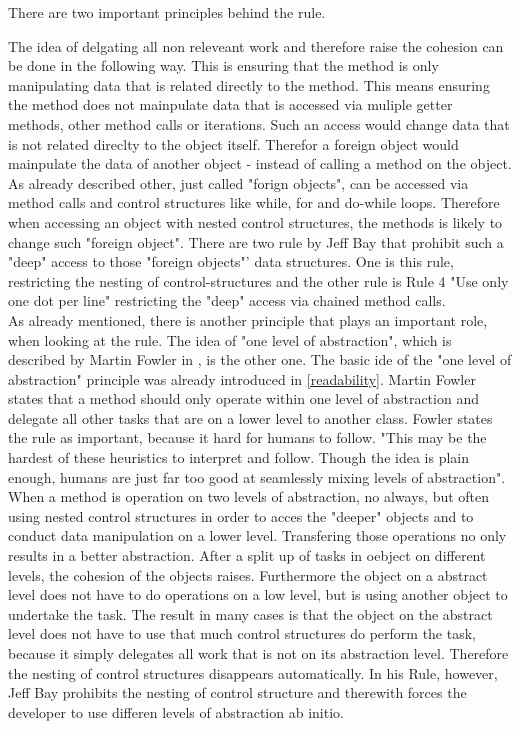 There are two important principles behind the rule. 

The idea of delgating all non releveant work and therefore raise the cohesion can be done in the following way.
This is ensuring that the method is only manipulating data that is related directly to the method. This means ensuring the method does not mainpulate data that is accessed via muliple getter methods, other method calls or iterations. Such an access would change data that is not related direclty to the object itself. Therefor a foreign object would mainpulate the data of another object - instead of calling a method on the object. As already described other, just called "forign objects", can be accessed via method calls and control structures like while, for and do-while loops. Therefore when accessing an object with nested control structures, the methods is likely to change such "foreign object". There are two rule by Jeff Bay that prohibit such a "deep" access to those "foreign objects"' data structures. One is this rule, restricting the nesting of control-structures and the other rule is Rule 4 "Use only one dot per line" restricting the "deep" access via chained method calls. \\

As already mentioned, there is another principle that plays an important role, when looking at the rule. The idea of "one level of abstraction", which is described by Martin Fowler in \cite{cc}, is the other one. The basic ide of the "one level of abstraction" principle was already introduced in \ref{readability}. Martin Fowler states that a method should only operate within one level of abstraction and delegate all other tasks that are on a lower level to another class. Fowler states the rule as important, because it hard for humans to follow. "This may be the hardest of these heuristics to interpret and follow. Though the idea is plain enough, humans are just far too good at seamlessly mixing levels of abstraction". When a method is operation on two levels of abstraction, no always, but often using nested control structures in order to acces the "deeper" objects and to conduct data manipulation on a lower level. Transfering those operations no only results in a better abstraction. After a split up of tasks in oebject on different levels, the cohesion of the objects raises. Furthermore the object on a abstract level does not have to do operations on a low level, but is using another object to undertake the task. The result in many cases is that the object on the abstract level does not have to use that much control structures do perform the task, because it simply delegates all work that is not on its abstraction level. Therefore the nesting of control structures disappears automatically. In his Rule, however, Jeff Bay prohibits the nesting of control structure and therewith forces the developer to use differen levels of abstraction ab initio. \\

